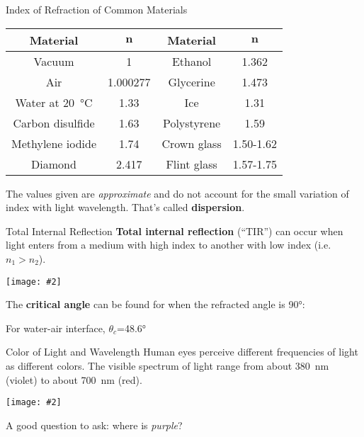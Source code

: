 \documentclass[12pt,compress,aspectratio=169]{beamer}
\newcommand{\pic}[2]{\texttt{[image: \#2]}}
\newcommand{\eq}[2]{\vspace{#1}{\LARGE\begin{displaymath}#2\end{displaymath}}}
\begin{document}
\begin{frame}{Index of Refraction of Common Materials}
  \begin{center}
    \begin{tabular}{c|c||c|c}
      \rowcolor{pink}
      \textbf{Material} & $\bm{n}$ & \textbf{Material} & $\bm{n}$\\ \hline
      Vacuum           & 1        & Ethanol     & 1.362 \\
      Air              & 1.000277 & Glycerine   & 1.473 \\
      Water at \SI{20}{\celsius} & 1.33 & Ice         & 1.31 \\
      Carbon disulfide & 1.63     & Polystyrene & 1.59 \\
      Methylene iodide & 1.74     & Crown glass & 1.50-1.62\\
      Diamond          & 2.417    & Flint glass & 1.57-1.75\\
    \end{tabular}
  \end{center}
  The values given are \emph{approximate} and do not account for the small
  variation of index with light wavelength. That's called \textbf{dispersion}.
\end{frame}



\begin{frame}{Total Internal Reflection}
  \textbf{Total internal reflection} (``TIR'') can occur when light enters from
  a medium with high index to another with low index (i.e.\ $n_1>n_2$).
  \begin{center}
    \pic{.55}{graphics/660px-RefractionReflextion.png}
  \end{center}
  The \textbf{critical angle} can be found for when the refracted angle is
  \ang{90}:

  \eq{-.2in}{
    \boxed{\theta_c=\sin^{-1}\left(\frac{n_2}{n_1}\right)}
  }
  For water-air interface, $\theta_c$=\ang{48.6}
\end{frame}



\begin{frame}{Color of Light and Wavelength}
  Human eyes perceive different frequencies of light as different colors. The
  visible spectrum of light range from about \SI{380}{\nano\metre} (violet) to
  about \SI{700}{\nano\metre} (red).
  \begin{center}
    \pic{.6}{graphics/electromagneticspectrum-141b490bac872789434.png}
  \end{center}
  A good question to ask: where is \emph{purple}?
\end{frame}
\end{document}
